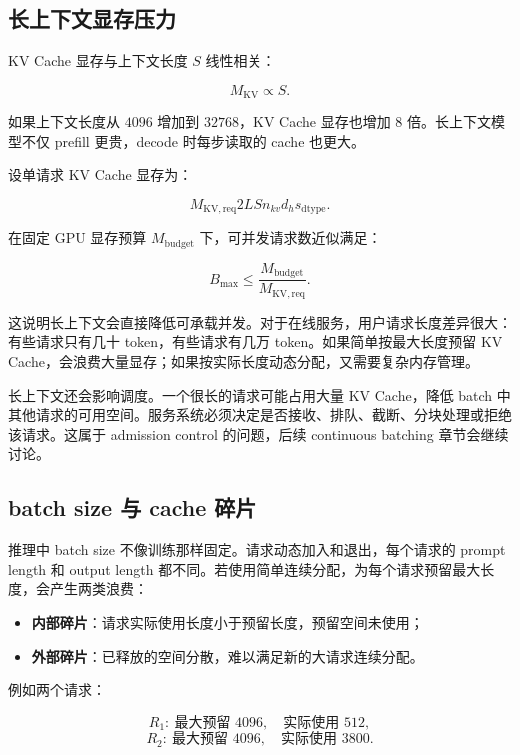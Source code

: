 \subsection{长上下文显存压力}
\label{subsec:long-context-memory-pressure}

KV Cache 显存与上下文长度 $S$ 线性相关：

\[
M_{\mathrm{KV}}\propto S.
\]

如果上下文长度从 $4096$ 增加到 $32768$，KV Cache 显存也增加 $8$ 倍。长上下文模型不仅 prefill 更贵，decode 时每步读取的 cache 也更大。

设单请求 KV Cache 显存为：

\[
M_{\mathrm{KV,req}}
2L S n_{kv}d_hs_{\mathrm{dtype}}.
\]

在固定 GPU 显存预算 $M_{\mathrm{budget}}$ 下，可并发请求数近似满足：

\[
B_{\max}
\le
\frac{M_{\mathrm{budget}}}
{M_{\mathrm{KV,req}}}.
\]

这说明长上下文会直接降低可承载并发。对于在线服务，用户请求长度差异很大：有些请求只有几十 token，有些请求有几万 token。如果简单按最大长度预留 KV Cache，会浪费大量显存；如果按实际长度动态分配，又需要复杂内存管理。

长上下文还会影响调度。一个很长的请求可能占用大量 KV Cache，降低 batch 中其他请求的可用空间。服务系统必须决定是否接收、排队、截断、分块处理或拒绝该请求。这属于 admission control 的问题，后续 continuous batching 章节会继续讨论。

\subsection{batch size 与 cache 碎片}
\label{subsec:batch-size-cache-fragmentation}

推理中 batch size 不像训练那样固定。请求动态加入和退出，每个请求的 prompt length 和 output length 都不同。若使用简单连续分配，为每个请求预留最大长度，会产生两类浪费：

\begin{itemize}
\item \textbf{内部碎片}：请求实际使用长度小于预留长度，预留空间未使用；
\item \textbf{外部碎片}：已释放的空间分散，难以满足新的大请求连续分配。
\end{itemize}

例如两个请求：

\[
R_1:\ \text{最大预留 }4096,\quad \text{实际使用 }512,
\]
\[
R_2:\ \text{最大预留 }4096,\quad \text{实际使用 }3800.
\]

